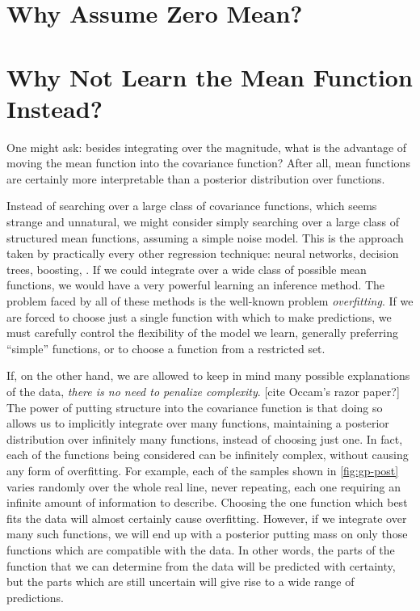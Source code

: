 \outbpdocument{


}




\iffalse
\section{Why Assume Zero Mean?}

\section{Why Not Learn the Mean Function Instead?}
One might ask: besides integrating over the magnitude, what is the advantage of moving the mean function into the covariance function?
After all, mean functions are certainly more interpretable than a posterior distribution over functions.

Instead of searching over a large class of covariance functions, which seems strange and unnatural, we might consider simply searching over a large class of structured mean functions, assuming a simple \iid noise model.
This is the approach taken by practically every other regression technique: neural networks, decision trees, boosting, \etc.
If we could integrate over a wide class of possible mean functions, we would have a very powerful learning an inference method.
The problem faced by all of these methods is the well-known problem \emph{overfitting}.
If we are forced to choose just a single function with which to make predictions, we must carefully control the flexibility of the model we learn, generally preferring ``simple'' functions, or to choose a function from a restricted set.

If, on the other hand, we are allowed to keep in mind many possible explanations of the data, \emph{there is no need to penalize complexity}. [cite Occam's razor paper?]
The power of putting structure into the covariance function is that doing so allows us to implicitly integrate over many functions, maintaining a posterior distribution over infinitely many functions, instead of choosing just one.
In fact, each of the functions being considered can be infinitely complex, without causing any form of overfitting.
For example, each of the samples shown in \cref{fig:gp-post} varies randomly over the whole real line, never repeating, each one requiring an infinite amount of information to describe.
Choosing the one function which best fits the data will almost certainly cause overfitting.
However, if we integrate over many such functions, we will end up with a posterior putting mass on only those functions which are compatible with the data.
In other words, the parts of the function that we can determine from the data will be predicted with certainty, but the parts which are still uncertain will give rise to a wide range of predictions.

